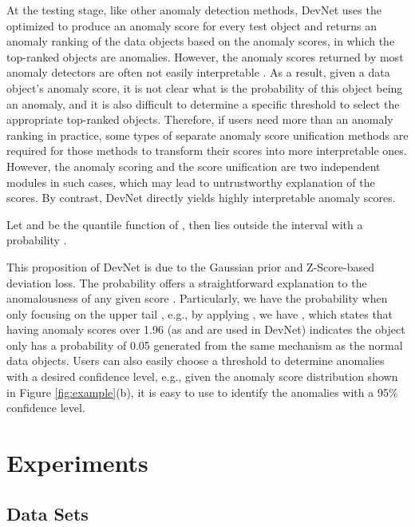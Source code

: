\documentclass[sigconf]{acmart}
\begin{document}
At the testing stage, like other anomaly detection methods, DevNet uses the optimized  to produce an anomaly score for every test object and returns an anomaly ranking of the data objects based on the anomaly scores, in which the top-ranked objects are anomalies. However, the anomaly scores returned by most anomaly detectors are often not easily interpretable \cite{kriegel2011interpreting}. As a result, given a data object's anomaly score, it is not clear what is the probability of this object being an anomaly, and it is also difficult to determine a specific threshold to select the appropriate top-ranked objects. Therefore, if users need more than an anomaly ranking in practice, some types of separate anomaly score unification methods \cite{kriegel2011interpreting} are required for those methods to transform their scores into more interpretable ones. However, the anomaly scoring and the score unification are two independent modules in such cases, which may lead to untrustworthy explanation of the scores. By contrast, DevNet directly yields highly interpretable anomaly scores.

\begin{proposition}
Let  and  be the quantile function of , then  lies outside the interval  with a probability .
\end{proposition}

This proposition of DevNet is due to the Gaussian prior and Z-Score-based deviation loss. The probability  offers a straightforward explanation to the anomalousness of any given score . Particularly, we have the probability  when only focusing on the upper tail , e.g., by applying , we have , which states that having anomaly scores over 1.96 (as  and  are used in DevNet) indicates the object only has a probability of 0.05 generated from the same mechanism as the normal data objects. Users can also easily choose a threshold to determine anomalies with a desired confidence level, e.g., given the anomaly score distribution shown in Figure \ref{fig:example}(b), it is easy to use  to identify the anomalies with a 95\% confidence level.





\section{Experiments}

\subsection{Data Sets}
\end{document}
